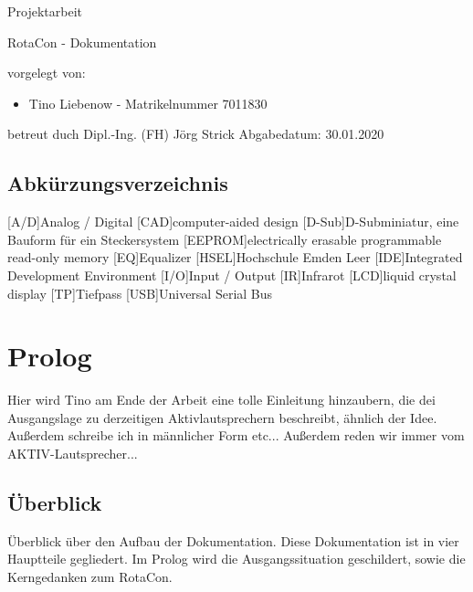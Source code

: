 \documentclass[11pt, titlepage, fleqn]{report}
\author{Liebenow,Tino}
\date{\textit{<2020-01-26 Sun>}}
\begin{document}
\begin{titlepage}
	\hsellogo\hfill Projektarbeit
	\par
	\vspace{4cm}
	\noindent\parbox{0.8\textwidth}{\Huge RotaCon - Dokumentation}  
	\vspace{2cm}


	\Large \noindent vorgelegt von:
	\begin{itemize}
		\item Tino Liebenow - Matrikelnummer 7011830
	\end{itemize}
	\vspace{2cm}
	betreut duch\newline
	Dipl.-Ing. (FH) Jörg Strick\newline
	Abgabedatum: 30.01.2020
\end{titlepage}
	\newpage
	\tableofcontents
	\newpage
	\begingroup
		\renewcommand\clearpage{\relax}
		\listoffigures
		\listoftables
	\endgroup
	\newpage
    \section*{\Huge Abkürzungsverzeichnis}%
    \label{sec:Abkürzungsverzeichnis}
    \vspace{1cm}
	\begin{acronym}
		[A/D]{Analog / Digital}
		[CAD]{computer-aided design}
		[D-Sub]{D-Subminiatur, eine Bauform für ein Steckersystem}
		[EEPROM]{electrically erasable programmable read-only memory}
		[EQ]{Equalizer}
		{Hochschule Emden Leer}
		[IDE]{Integrated Development Environment}
		[I/O]{Input / Output}
		[IR]{Infrarot}
		[LCD]{liquid crystal display}
		[TP]{Tiefpass}
		[USB]{Universal Serial Bus}
    \end{acronym}
	\newpage
	\chapter{Prolog}
		Hier wird Tino am Ende der Arbeit eine tolle Einleitung hinzaubern, die dei Ausgangslage zu derzeitigen Aktivlautsprechern beschreibt, ähnlich der Idee. Außerdem schreibe ich in männlicher Form etc...\newline
		Außerdem reden wir immer vom AKTIV-Lautsprecher...
	\section*{Überblick}
		Überblick über den Aufbau der Dokumentation.\newline
		Diese Dokumentation ist in vier Hauptteile gegliedert. Im Prolog wird die Ausgangssituation geschildert, sowie die Kerngedanken zum RotaCon.
\end{document}
